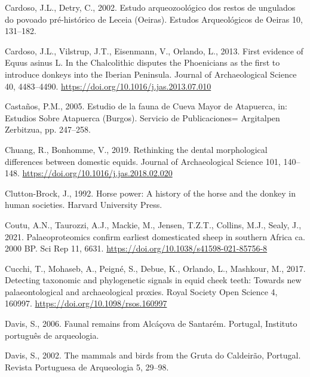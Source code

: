 \documentclass[preprint, 3p, authoryear]{elsarticle} %
\newlength{\cslhangindent}
\newlength{\cslentryspacingunit} %
\newenvironment{CSLReferences}[2] %
 {%
  \setlength{\parindent}{0pt}
  \ifodd #1
  \let\oldpar\par
  \def\par{\hangindent=\cslhangindent\oldpar}
  \fi
  \setlength{\parskip}{#2\cslentryspacingunit}
 }%
 {}
\begin{document}
\begin{CSLReferences}{1}{0}
\leavevmode{}%
Cardoso, J.L., Detry, C., 2002. Estudo arqueozoológico dos restos de ungulados do povoado pré-histórico de {Leceia} ({Oeiras}). Estudos Arqueológicos de Oeiras 10, 131--182.

\leavevmode{}%
Cardoso, J.L., Vilstrup, J.T., Eisenmann, V., Orlando, L., 2013. First evidence of {Equus} asinus {L}. In the {Chalcolithic} disputes the {Phoenicians} as the first to introduce donkeys into the {Iberian Peninsula}. Journal of Archaeological Science 40, 4483--4490. \url{https://doi.org/10.1016/j.jas.2013.07.010}

\leavevmode{}%
Castaños, P.M., 2005. Estudio de la fauna de {Cueva Mayor} de {Atapuerca}, in: Estudios Sobre {Atapuerca} ({Burgos}). {Servicio de Publicaciones= Argitalpen Zerbitzua}, pp. 247--258.

\leavevmode{}%
Chuang, R., Bonhomme, V., 2019. Rethinking the dental morphological differences between domestic equids. Journal of Archaeological Science 101, 140--148. \url{https://doi.org/10.1016/j.jas.2018.02.020}

\leavevmode{}%
Clutton-Brock, J., 1992. Horse power: A history of the horse and the donkey in human societies. {Harvard University Press}.

\leavevmode{}%
Coutu, A.N., Taurozzi, A.J., Mackie, M., Jensen, T.Z.T., Collins, M.J., Sealy, J., 2021. Palaeoproteomics confirm earliest domesticated sheep in southern {Africa} ca. 2000 {BP}. Sci Rep 11, 6631. \url{https://doi.org/10.1038/s41598-021-85756-8}

\leavevmode{}%
Cucchi, T., Mohaseb, A., Peigné, S., Debue, K., Orlando, L., Mashkour, M., 2017. Detecting taxonomic and phylogenetic signals in equid cheek teeth: Towards new palaeontological and archaeological proxies. Royal Society Open Science 4, 160997. \url{https://doi.org/10.1098/rsos.160997}

\leavevmode{}%
Davis, S., 2006. Faunal remains from {Alcáçova} de {Santarém}. Portugal, Instituto português de arqueologia.

\leavevmode{}%
Davis, S., 2002. The mammals and birds from the {Gruta} do {Caldeirão}, {Portugal}. Revista Portuguesa de Arqueologia 5, 29--98.


\end{CSLReferences}
\end{document}
